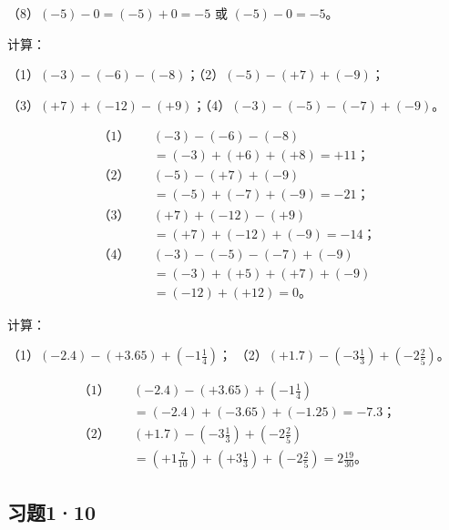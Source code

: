 （8）\((-5) - 0 = (-5) + 0 = -5\) 或 \((-5) - 0 = -5\)。

 计算：
\par\smallskip
（1）\((-3) - (-6) - (-8)\)；\qquad （2）\((-5) - (+7) + (-9)\)；
\par\smallskip
（3）\((+7) + (-12) - (+9)\)；\qquad （4）\((-3) - (-5) - (-7) + (-9)\)。

\begin{align*}
\text{（1）}\quad & (-3) - (-6) - (-8) \\
&= (-3) + (+6) + (+8) = +11；\\[6pt]
\text{（2）}\quad & (-5) - (+7) + (-9) \\
&= (-5) + (-7) + (-9) = -21；\\[6pt]
\text{（3）}\quad & (+7) + (-12) - (+9) \\
&= (+7) + (-12) + (-9) = -14；\\[6pt]
\text{（4）}\quad & (-3) - (-5) - (-7) + (-9) \\
&= (-3) + (+5) + (+7) + (-9) \\
&= (-12) + (+12) = 0。
\end{align*}

 计算：
\par\smallskip
（1）\((-2.4) - (+3.65) + \left(-1\frac{1}{4}\right)\)；\qquad
（2）\((+1.7) - \left(-3\frac{1}{3}\right) + \left(-2\frac{2}{5}\right)\)。

\begin{align*}
\text{（1）}\quad & (-2.4) - (+3.65) + \left(-1\frac{1}{4}\right) \\
&= (-2.4) + (-3.65) + (-1.25) = -7.3；\\[6pt]
\text{（2）}\quad & (+1.7) - \left(-3\frac{1}{3}\right) + \left(-2\frac{2}{5}\right) \\
&= \left(+1\frac{7}{10}\right) + \left(+3\frac{1}{3}\right) + \left(-2\frac{2}{5}\right) = 2\frac{19}{30}。
\end{align*}

\subsection{习题1·10}

